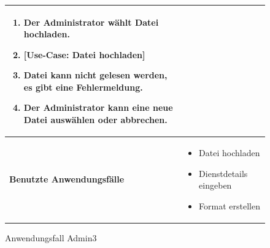 \begin{figure}[h]
\begin{tabularx}{\textwidth}{ X | X }
\begin{enumerate}
			\item Der Administrator wählt Datei hochladen.
			\item {[Use-Case: Datei hochladen]}
			\item Datei kann nicht gelesen werden, es gibt eine Fehlermeldung.
			\item Der Administrator kann eine neue Datei auswählen oder abbrechen.
		\end{enumerate}  \\ \hline
		\textbf{Benutzte Anwendungsfälle} &
    \begin{itemize}
			\item Datei hochladen
			\item Dienstdetails eingeben
      \item Format erstellen
		\end{itemize} \\ \hline
	\end{tabularx}
	\caption{Anwendungsfall Admin3}
	\label{fig:anwendungsfall-server-tabelle-xx-1}
\end{figure}
